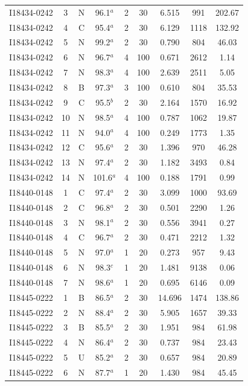 \begin{table}
\begin{tabular}{ccccccccc}
I18434-0242 & 3 & N & 96.1$^{a}$ & 2 & 30 & 6.515 & 991 & 202.67 \\
I18434-0242 & 4 & C & 95.4$^{a}$ & 2 & 30 & 6.129 & 1118 & 132.92 \\
I18434-0242 & 5 & N & 99.2$^{a}$ & 2 & 30 & 0.790 & 804 & 46.03 \\
I18434-0242 & 6 & N & 96.7$^{a}$ & 4 & 100 & 0.671 & 2612 & 1.14 \\
I18434-0242 & 7 & N & 98.3$^{a}$ & 4 & 100 & 2.639 & 2511 & 5.05 \\
I18434-0242 & 8 & B & 97.3$^{a}$ & 3 & 100 & 0.610 & 804 & 35.53 \\
I18434-0242 & 9 & C & 95.5$^{b}$ & 2 & 30 & 2.164 & 1570 & 16.92 \\
I18434-0242 & 10 & N & 98.5$^{a}$ & 4 & 100 & 0.787 & 1062 & 19.87 \\
I18434-0242 & 11 & N & 94.0$^{a}$ & 4 & 100 & 0.249 & 1773 & 1.35 \\
I18434-0242 & 12 & C & 95.6$^{a}$ & 2 & 30 & 1.396 & 970 & 46.28 \\
I18434-0242 & 13 & N & 97.4$^{a}$ & 2 & 30 & 1.182 & 3493 & 0.84 \\
I18434-0242 & 14 & N & 101.6$^{a}$ & 4 & 100 & 0.188 & 1791 & 0.99 \\
I18440-0148 & 1 & C & 97.4$^{a}$ & 2 & 30 & 3.099 & 1000 & 93.69 \\
I18440-0148 & 2 & C & 96.8$^{a}$ & 2 & 30 & 0.501 & 2290 & 1.26 \\
I18440-0148 & 3 & N & 98.1$^{a}$ & 2 & 30 & 0.556 & 3941 & 0.27 \\
I18440-0148 & 4 & C & 96.7$^{a}$ & 2 & 30 & 0.471 & 2212 & 1.32 \\
I18440-0148 & 5 & N & 97.0$^{a}$ & 1 & 20 & 0.273 & 957 & 9.43 \\
I18440-0148 & 6 & N & 98.3$^{c}$ & 1 & 20 & 1.481 & 9138 & 0.06 \\
I18440-0148 & 7 & N & 98.6$^{a}$ & 1 & 20 & 0.695 & 6146 & 0.09 \\
I18445-0222 & 1 & B & 86.5$^{a}$ & 2 & 30 & 14.696 & 1474 & 138.86 \\
I18445-0222 & 2 & N & 88.4$^{a}$ & 2 & 30 & 5.905 & 1657 & 39.33 \\
I18445-0222 & 3 & B & 85.5$^{a}$ & 2 & 30 & 1.951 & 984 & 61.98 \\
I18445-0222 & 4 & N & 86.4$^{a}$ & 2 & 30 & 0.737 & 984 & 23.43 \\
I18445-0222 & 5 & U & 85.2$^{a}$ & 2 & 30 & 0.657 & 984 & 20.89 \\
I18445-0222 & 6 & N & 87.7$^{a}$ & 1 & 20 & 1.430 & 984 & 45.45 \\

\end{tabular}
\end{table}
